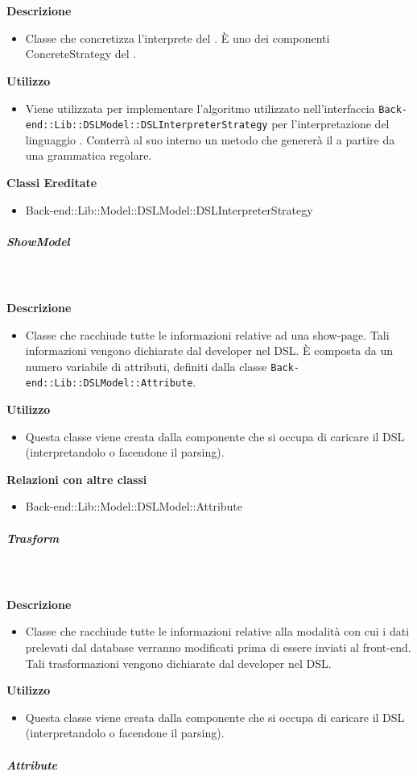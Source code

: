				\textbf{\\ \\ Descrizione} 
					\begin{itemize}
						\item[] Classe che concretizza l'interprete del . È uno dei componenti ConcreteStrategy del  .
					\end{itemize}      
				\textbf{Utilizzo}  
					\begin{itemize}
						\item[] Viene utilizzata per implementare l'algoritmo utilizzato nell'interfaccia \texttt{Back-end::Lib::DSLModel::DSLInterpreterStrategy} per l'interpretazione del linguaggio . Conterrà al suo interno un metodo che genererà il  a partire da una grammatica regolare.
					\end{itemize}
					\textbf{Classi Ereditate}
					\begin{itemize}
								\item{Back-end::Lib::Model::DSLModel::DSLInterpreterStrategy}
					\end{itemize}
			\subparagraph{ShowModel}
				
				\textbf{\\ \\ Descrizione} 
					\begin{itemize}
						\item[] Classe che racchiude tutte le informazioni relative ad una show-page. Tali informazioni vengono dichiarate dal developer nel DSL. È composta da un numero variabile di attributi, definiti dalla classe \texttt{Back-end::Lib::DSLModel::Attribute}.
					\end{itemize}      
				\textbf{Utilizzo}  
					\begin{itemize}
						\item[] Questa classe viene creata dalla componente che si occupa di caricare il DSL (interpretandolo o facendone il parsing).
					\end{itemize}
					\textbf{Relazioni con altre classi}
					\begin{itemize}
							\item{Back-end::Lib::Model::DSLModel::Attribute}
					\end{itemize}
			\subparagraph{Trasform}
				
				\textbf{\\ \\ Descrizione} 
					\begin{itemize}
						\item[] Classe che racchiude tutte le informazioni relative alla modalità con cui i dati prelevati dal database verranno modificati prima di essere inviati al front-end.
Tali trasformazioni vengono dichiarate dal developer nel DSL.
					\end{itemize}      
				\textbf{Utilizzo}  
					\begin{itemize}
						\item[] Questa classe viene creata dalla componente che si occupa di caricare il DSL (interpretandolo o facendone il parsing).
					\end{itemize}
			\subparagraph{Attribute}
				
